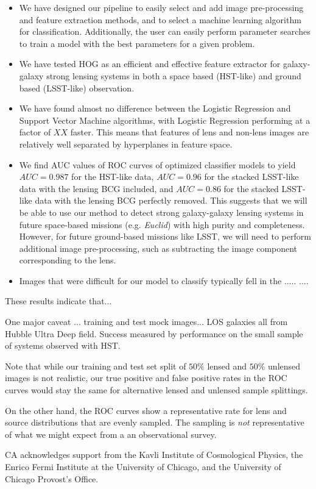 \documentclass{emulateapj}
\begin{document}
\begin{itemize}

\item We have designed our pipeline to easily select and add image
  pre-processing and feature extraction methods, and to select a
  machine learning algorithm for classification.  Additionally, the
  user can easily perform parameter searches to train a model with the
  best parameters for a given problem.

\item We have tested HOG as an efficient and effective feature
  extractor for galaxy-galaxy strong lensing systems in both a space
  based (HST-like) and ground based (LSST-like) observation.  

\item We have found almost no difference between the Logistic
  Regression and Support Vector Machine algorithms, with Logistic
  Regression performing at a factor of $XX$ faster.  This means that
  features of lens and non-lens images are relatively well separated
  by hyperplanes in feature space.

\item We find AUC values of ROC curves of optimized classifier models
  to yield $AUC=0.987$ for the HST-like data, $AUC=0.96$ for the
  stacked LSST-like data with the lensing BCG included, and $AUC=0.86$
  for the stacked LSST-like data with the lensing BCG perfectly
  removed.  This suggests that we will be able to use our method to
  detect strong galaxy-galaxy lensing systems in future space-based
  missions (e.g. {\em Euclid}) with high purity and completeness.
  However, for future ground-based missions like LSST, we will need to
  perform additional image pre-processing, such as subtracting the
  image component corresponding to the lens.

\item Images that were difficult for our model to classify typically
  fell in the ..... ....

\end{itemize}

These results indicate that...

One major caveat ... training and test mock images... LOS galaxies all
from Hubble Ultra Deep field.  Success measured by performance on the
small sample of systems observed with HST.

Note that while our training and test set split of $50\%$ lensed and
$50\%$ unlensed images is not realistic, our true positive and false
positive rates in the ROC curves would stay the same for alternative
lensed and unlensed sample splittings.  

On the other hand, the ROC curves show a representative rate for lens
and source distributions that are evenly sampled.  The sampling is
{\it not} representative of what we might expect from a an
observational survey.


\acknowledgments CA acknowledges support from the Kavli Institute of
Cosmological Physics, the Enrico Fermi Institute at the University of
Chicago, and the University of Chicago Provost's Office.
\lastpagefootnotes



\end{document}
